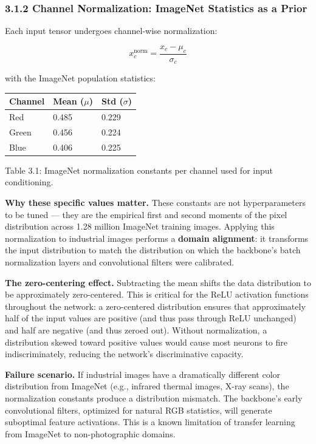 \subsubsection{3.1.2 Channel Normalization: ImageNet Statistics as a Prior}\label{channel-normalization-imagenet-statistics-as-a-prior}

Each input tensor undergoes channel-wise normalization:

\[x_c^{\text{norm}} = \frac{x_c - \mu_c}{\sigma_c}\]

with the ImageNet population statistics:

\begin{longtable}[]{@{}lll@{}}
\toprule\noalign{}
Channel & Mean (\(\mu\)) & Std (\(\sigma\)) \\
\midrule\noalign{}
\endhead
\bottomrule\noalign{}
\endlastfoot
Red & 0.485 & 0.229 \\
Green & 0.456 & 0.224 \\
Blue & 0.406 & 0.225 \\
\end{longtable}

Table 3.1: ImageNet normalization constants per channel used for input conditioning.

\textbf{Why these specific values matter.} These constants are not hyperparameters to be tuned --- they are the empirical first and second moments of the pixel distribution across 1.28 million ImageNet training images. Applying this normalization to industrial images performs a \textbf{domain alignment}: it transforms the input distribution to match the distribution on which the backbone's batch normalization layers and convolutional filters were calibrated.

\textbf{The zero-centering effect.} Subtracting the mean shifts the data distribution to be approximately zero-centered. This is critical for the ReLU activation functions throughout the network: a zero-centered distribution ensures that approximately half of the input values are positive (and thus pass through ReLU unchanged) and half are negative (and thus zeroed out). Without normalization, a distribution skewed toward positive values would cause most neurons to fire indiscriminately, reducing the network's discriminative capacity.

\textbf{Failure scenario.} If industrial images have a dramatically different color distribution from ImageNet (e.g., infrared thermal images, X-ray scans), the normalization constants produce a distribution mismatch. The backbone's early convolutional filters, optimized for natural RGB statistics, will generate suboptimal feature activations. This is a known limitation of transfer learning from ImageNet to non-photographic domains.

